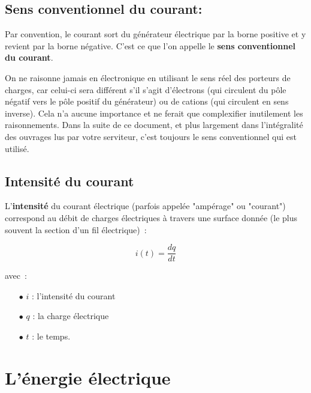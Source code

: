 
\subsection*{ Sens conventionnel du courant: }

Par convention, le courant sort du générateur électrique par la borne positive et y revient par la borne négative. C'est ce que l'on appelle le \textbf{sens conventionnel du courant}. \\

On ne raisonne jamais en électronique en utilisant le sens réel des porteurs de charges, car celui-ci sera différent s'il s'agit d'électrons (qui circulent du pôle négatif vers le pôle positif du générateur) ou de cations (qui circulent en sens inverse). Cela n'a aucune importance et ne ferait que complexifier inutilement les raisonnements. Dans la suite de ce document, et plus largement dans l'intégralité des ouvrages lus par votre serviteur, c'est toujours le sens conventionnel qui est utilisé.

\subsection*{Intensité du courant}

L'\textbf{intensité} du courant électrique (parfois appelée "ampérage" ou "courant") correspond au débit de charges électriques à travers une surface donnée (le plus souvent la section d'un fil électrique)~: 

\begin{equation}
	i(t) = \dfrac{dq}{dt} 
\end{equation}

avec~: \\
\begin{itemize}
	\item[$\bullet$] $i$ : l'intensité du courant
	\item[$\bullet$] $q$ : la charge électrique
	\item[$\bullet$] $t$ : le temps.
\end{itemize}

\section{L'énergie électrique}


